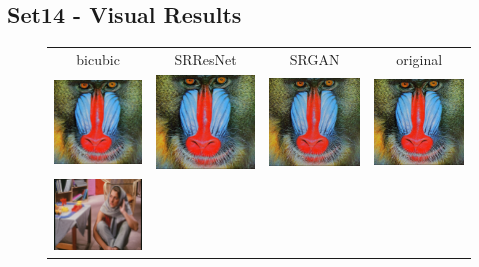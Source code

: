 \documentclass[10pt,twocolumn,letterpaper]{article}
\begin{document}
\subsection{Set14 - Visual Results}
\label{app:Set14}
\begin{figure}[h!] 
  	\begin{tabular}{cccc}
  		bicubic & SRResNet & SRGAN & original \\
     	\includegraphics[width=1.5in]{images/used/appendix/jpg/Set14/baboon_bicubic}&
     	\includegraphics[width=1.5in]{images/used/appendix/jpg/Set14/baboon_SRResNet-MSE} &
     	\includegraphics[width=1.5in]{images/used/appendix/jpg/Set14/baboon_SRGAN-VGG54} &
     	\includegraphics[width=1.5in]{images/used/appendix/jpg/Set14/baboon_HR} \\
     	\includegraphics[width=1.5in]{images/used/appendix/jpg/Set14/barbara_bicubic}&

\end{tabular}
\end{figure}
\end{document}
